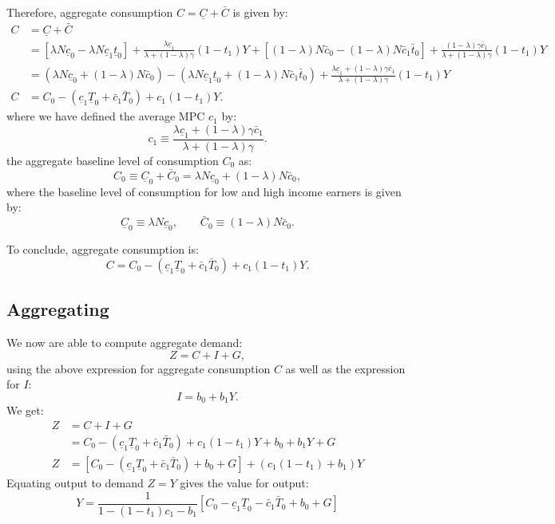 \documentclass[]{book}
\begin{document}
Therefore, aggregate consumption \(C=\underline{C} + \bar{C}\) is given
by: \[
\begin{aligned}
C&=\underline{C} + \bar{C}\\
&=\left[\lambda N  \underline{c}_{0}-\lambda  N \underline{c}_{1} \underline{t}_0 \right]+ \frac{\lambda \underline{c}_{1}}{\lambda+(1-\lambda)\gamma}(1-t_1)Y + 
\left[(1-\lambda)  N \bar{c}_{0}-(1-\lambda) N  \bar{c}_{1} \bar{t}_0\right] + 
\frac{(1-\lambda) \gamma\bar{c}_{1}}{\lambda+(1-\lambda)\gamma}(1-t_1)Y\\
&=\left(\lambda N  \underline{c}_{0}+(1-\lambda) N  \bar{c}_{0}\right)-\left(\lambda  N \underline{c}_{1} \underline{t}_0 +(1-\lambda) N  \bar{c}_{1} \bar{t}_0\right) +\frac{\lambda\underline{c}_{1}+\left(1-\lambda\right)\gamma\bar{c}_{1}}{\lambda+(1-\lambda)\gamma}(1-t_1)Y\\
C&=C_0 -\left(\underline{c}_{1}\underline{T}_0+\bar{c}_{1}\bar{T}_0\right)+c_1 (1-t_1) Y.
\end{aligned}
\] where we have defined the average MPC \(c_1\) by:
\[c_{1}\equiv\frac{\lambda\underline{c}_{1}+\left(1-\lambda\right)\gamma\bar{c}_{1}}{\lambda+(1-\lambda)\gamma}.\]
the aggregate baseline level of consumption \(C_0\) as:
\[C_{0} \equiv \underline{C}_0 +  \bar{C}_0 = \lambda  N \underline{c}_0 + (1-\lambda) N \bar{c}_0,\]
where the baseline level of consumption for low and high income earners
is given by:
\[\underline{C}_0\equiv \lambda  N \underline{c}_0, \qquad \bar{C}_0\equiv (1-\lambda) N \bar{c}_0.\]

To conclude, aggregate consumption is:
\[\boxed{C = C_0 -\left(\underline{c}_{1}\underline{T}_0+\bar{c}_{1}\bar{T}_0\right)+c_1 (1-t_1) Y}.\]

\subsection{Aggregating}\label{aggregating}

We now are able to compute aggregate demand: \[Z=C+I+G,\] using the
above expression for aggregate consumption \(C\) as well as the
expression for \(I\): \[I=b_0 +b_1 Y.\] We get: \[
\begin{aligned}
Z   &=C+I+G\\
    &=C_0 -\left(\underline{c}_{1}\underline{T}_0+\bar{c}_{1}\bar{T}_0\right)+c_1 (1-t_1) Y + b_{0}+b_{1}Y+G\\
Z   &=\left[C_0 -\left(\underline{c}_{1}\underline{T}_0+\bar{c}_{1}\bar{T}_0\right)+ b_{0} + G \right]+ \left(c_1(1-t_1) + b_1\right) Y 
\end{aligned}
\] Equating output to demand \(Z = Y\) gives the value for output:
\[\boxed{Y=\frac{1}{1-\left(1-t_{1}\right)c_{1}-b_{1}}\left[C_0-\underline{c}_{1}\underline{T}_{0}-\bar{c}_{1}\bar{T}_{0}+b_{0}+G\right]}\]
\end{document}
